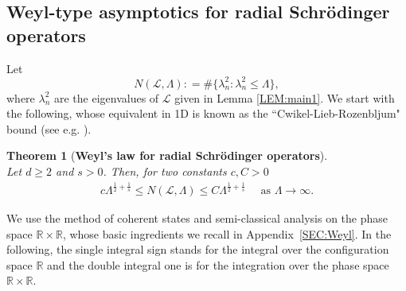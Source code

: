 \documentclass[%
11pt,  reqno]{amsart}
\newtheorem{theorem}{Theorem} [section]
\theoremstyle{remarkstyle}
\newcommand{\1}{\hspace{0.2mm}\text{I}\hspace{0.2mm}}
\newcommand{\R}{\mathbb{R}}
\renewcommand{\L}{\mathcal{L}}
\newcommand{\ld}{\lambda}
\newcommand{\Ld}{\Lambda}
\numberwithin{equation}{section}
\numberwithin{theorem}{section}
\begin{document}
	\subsection{Weyl-type asymptotics for radial Schr\"odinger operators}
	\label{subsec:Weyl}
	Let 
	\[
	N(\L, \Ld) : = \# \{\ld_n^2: \ld_n^2 \le \Ld \},
	\]
	where $\ld_n^2$ are the eigenvalues of $\L$ given in Lemma \ref{LEM:main1}. We start with the following, whose equivalent in 1D is known as the ``Cwikel-Lieb-Rozenbljum" bound (see e.g. \cite[Lemma D.1]{DR23}). 
	
	\begin{theorem}[\textbf{Weyl's law for radial Schr\"odinger operators}]\label{theo-Weyl-rad}\mbox{}\\
		Let $d\geq 2$ and $s>0$. Then, for two constants $c,C >0$ 
		\begin{align} \label{Weyl-rad}
			c \Lambda^{\frac{1}{2}+\frac{1}{s}} \leq N(\L,\Ld) \leq C \Lambda^{\frac{1}{2}+\frac{1}{s}} \quad \text{ as } \Lambda \to \infty.
		\end{align}
	\end{theorem}
	
	We use the method of coherent states and semi-classical analysis on the phase space $\R\times\R$, whose basic ingredients we recall in Appendix~\ref{SEC:Weyl}. In the following, the single integral sign stands for the integral over the configuration space $\R$ and the double integral one is for the integration over the phase space $\R \times \R$. 
	
\end{document}
